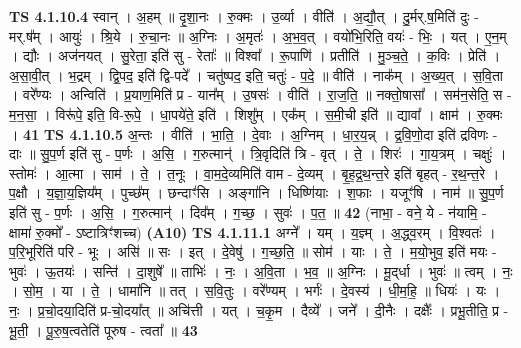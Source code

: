 \documentclass[17pt]{extarticle}
\begin{document}
                  \newline
                                \textbf{ TS 4.1.10.4} \newline
                  स्वान् । अ॒हम् ॥ दृ॒शा॒नः । रु॒क्मः । उ॒र्व्या । वीति॑ । अ॒द्यौ॒त् । दु॒र्मर्.ष॒मिति॑ दुः - मर्.ष᳚म् । आयुः॑ । श्रि॒ये । रु॒चा॒नः ॥ अ॒ग्निः । अ॒मृतः॑ । अ॒भ॒व॒त् । वयो॑भि॒रिति॒ वयः॑ - भिः॒ । यत् । ए॒न॒म् । द्यौः । अज॑नयत् । सु॒रेता॒ इति॑ सु - रेताः᳚ ॥ विश्वा᳚ । रू॒पाणि॑ । प्रतीति॑ । मु॒ञ्च॒ते॒ । क॒विः । प्रेति॑ । अ॒सा॒वी॒त् । भ॒द्रम् । द्वि॒पद॒ इति॑ द्वि-पदे᳚ । चतु॑ष्पद॒ इति॒ चतुः॑ - प॒दे॒ ॥ वीति॑ । नाक᳚म् । अ॒ख्य॒त् । स॒वि॒ता । वरे᳚ण्यः । अन्विति॑ । प्र॒याण॒मिति॑ प्र - यान᳚म् । उ॒षसः॑ । वीति॑ । रा॒ज॒ति॒ ॥ नक्तो॒षासा᳚ । सम॑न॒सेति॒ स - म॒न॒सा॒ । विरू॑पे॒ इति॒ वि-रू॒पे॒ । धा॒पये॑ते॒ इति॑ । शिशु᳚म् । एक᳚म् । स॒मी॒ची इति॑ ॥ द्यावा᳚ । क्षाम॑ । रु॒क्मः । \textbf{  41 } \newline
                  \newline
                                \textbf{ TS 4.1.10.5} \newline
                  अ॒न्तः । वीति॑ । भा॒ति॒ । दे॒वाः । अ॒ग्निम् । धा॒र॒य॒न्न् । द्र॒वि॒णो॒दा इति॑ द्रविणः - दाः ॥ सु॒प॒र्ण इति॑ सु - प॒र्णः । अ॒सि॒ । ग॒रुत्मान्॑ । त्रि॒वृदिति॑ त्रि - वृत् । ते॒ । शिरः॑ । गा॒य॒त्रम् । चक्षुः॑ । स्तोमः॑ । आ॒त्मा । साम॑ । ते॒ । त॒नूः । वा॒म॒दे॒व्यमिति॑ वाम - दे॒व्यम् । बृ॒ह॒द्र॒थ॒न्त॒रे इति॑ बृहत् - र॒थ॒न्त॒रे । प॒क्षौ । य॒ज्ञा॒य॒ज्ञिय᳚म् । पुच्छ᳚म् । छन्दाꣳ॑सि । अङ्गा॑नि । धिष्णि॑याः । श॒फाः । यजूꣳ॑षि । नाम॑ ॥ सु॒प॒र्ण इति॑ सु - प॒र्णः । अ॒सि॒ । ग॒रुत्मान्॑ । दिव᳚म् । ग॒च्छ॒ । सुवः॑ । प॒त॒ ॥ \textbf{  42} \newline
                  \newline
                      (नाभा॒ - वने॒ ये - न॑यामि॒ - क्षामा॑ रु॒क्मो᳚ - ऽष्टात्रिꣳ॑शच्च)  \textbf{(A10)} \newline \newline
                                \textbf{ TS 4.1.11.1} \newline
                  अग्ने᳚ । यम् । य॒ज्ञ्म् । अ॒द्ध्व॒रम् । वि॒श्वतः॑ । प॒रि॒भूरिति॑ परि - भूः । असि॑ ॥ सः । इत् । दे॒वेषु॑ । ग॒च्छ॒ति॒ ॥ सोम॑ । याः । ते॒ । म॒यो॒भुव॒ इति॑ मयः - भुवः॑ । ऊ॒तयः॑ । सन्ति॑ । दा॒शुषे᳚ ॥ ताभिः॑ । नः॒ । अ॒वि॒ता । भ॒व॒ ॥ अ॒ग्निः । मू॒द्‌र्धा । भुवः॑ ॥ त्वम् । नः॒ । सो॒म॒ । या । ते॒ । धामा॑नि ॥ तत् । स॒वि॒तुः । वरे᳚ण्यम् । भर्गः॑ । दे॒वस्य॑ । धी॒म॒हि॒ ॥ धियः॑ । यः । नः॒ । प्र॒चो॒दया॒दिति॑ प्र-चो॒दया᳚त् ॥ अचि॑त्ती । यत् । च॒कृ॒म । दैव्ये᳚ । जने᳚ । दी॒नैः । दक्षैः᳚ । प्रभू॒तीति॒ प्र - भू॒ती॒ । पू॒रु॒ष॒त्वतेति॑ पूरुष - त्वता᳚ ॥ \textbf{  43} \newline
\end{document}

